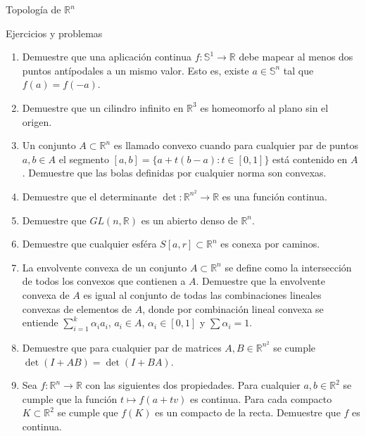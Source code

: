 \begin{chapter}{Topología de $\mathbb{R}^n$}
\begin{section}{Ejercicios y problemas}
\begin{enumerate}
    \item Demuestre que una aplicación continua $f: \mathbb{S}^1 \to \mathbb{R}$ debe mapear al menos dos puntos antípodales a un mismo valor. Esto es, existe $a \in \mathbb{S}^n$ tal que $f(a) = f(-a)$.
    \item Demuestre que un cilindro infinito en $\mathbb{R}^3$ es homeomorfo al plano sin el origen.
    \item Un conjunto $A \subset \mathbb{R}^n$ es llamado convexo cuando para cualquier par de puntos $a, b \in A$ el segmento $[a,b] = \{ a + t(b-a): t \in [0,1] \}$ está contenido en $A$. Demuestre que las bolas definidas por cualquier norma son convexas.
    \item Demuestre que el determinante $\det: \mathbb{R}^{n^2} \to \mathbb{R}$ es una función continua.
    \item Demuestre que $GL(n, \mathbb{R})$ es un abierto denso de $\mathbb{R}^n$.
    \item Demuestre que cualquier esféra $S[a, r] \subset \mathbb{R}^n$ es conexa por caminos.
    \item La envolvente convexa de un conjunto $A \subset \mathbb{R}^n$ se define como la intersección de todos los convexos que contienen a $A$. Demuestre que la envolvente convexa de $A$ es igual al conjunto de todas las combinaciones lineales convexas de elementos de $A$, donde por combinación lineal convexa se entiende $\sum_{i=1}^k \alpha_i a_i$, $a_i \in A$, $\alpha_i \in [0,1]$ y $\sum \alpha_i = 1$. 
    \item Demuestre que para cualquier par de matrices $A, B \in \mathbb{R}^{n^2}$ se cumple $\det (I + AB) = \det (I + BA)$.
    \item Sea $f: \mathbb{R}^n \to \mathbb{R}$ con las siguientes dos propiedades. Para cualquier $a,b \in \mathbb{R}^2$ se cumple que la función $t \mapsto f(a + tv)$ es continua. Para cada compacto $K \subset \mathbb{R}^2$ se cumple que $f(K)$ es un compacto de la recta. Demuestre que $f$ es continua.
\end{enumerate}


\end{section}
\end{chapter}
